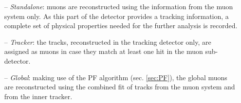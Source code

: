 \begin{itemize}
 \item [--] \textit{Standalone}: muons are reconstructed using the information from the muon system only. As 
 this part of the detector provides a tracking information, a complete set of physical properties needed for the further
 analysis is recorded.
 
 \item [--] \textit{Tracker}: the tracks, reconstructed in the tracking detector only, are assigned as muons in case they 
 match at least one hit in the muon sub-detector.
 
 \item [--] \textit{Global}: making use of the PF algorithm (sec. \ref{sec:PF}), the global muons are reconstructed using 
 the combined fit of tracks from the muon system and from the inner tracker.
\end{itemize}

%
% 
% 
% 
